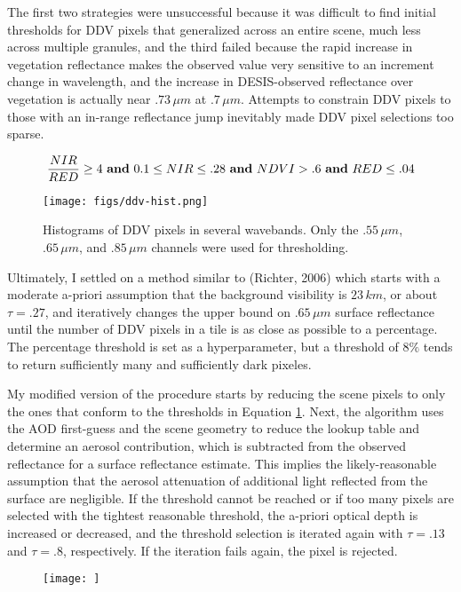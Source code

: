 \documentclass[12pt]{article}
\begin{document}
The first two strategies were unsuccessful because it was difficult to find initial thresholds for DDV pixels that generalized across an entire scene, much less across multiple granules, and the third failed because the rapid increase in vegetation reflectance makes the observed value very sensitive to an increment change in wavelength, and the increase in DESIS-observed reflectance over vegetation is actually near $.73\,\si{\mu m}$ at $.7\,\si{\mu m}$. Attempts to constrain DDV pixels to those with an in-range reflectance jump inevitably made DDV pixel selections too sparse.

\begin{equation}\label{ddv_thresh}
    \frac{NIR}{RED} \geq 4 \text{ \textbf{and} } 0.1 \leq NIR \leq .28 \text{ \textbf{and} } NDVI > .6 \text{ \textbf{and} } RED \leq .04
\end{equation}

\begin{figure}[h!]
    \centering
    \begin{center}
        \texttt{[image: figs/ddv-hist.png]}
    \end{center}
    \caption{Histograms of DDV pixels in several wavebands. Only the $.55\,\si{\mu m}$, $.65\,\si{\mu m}$, and $.85\,\si{\mu m}$ channels were used for thresholding.}
    \label{ddv-hist}
\end{figure}

Ultimately, I settled on a method similar to (Richter, 2006) which starts with a moderate a-priori assumption that the background visibility is $23\,\si{km}$, or about $\tau = .27$, and iteratively changes the upper bound on $.65\,\si{\mu m}$ surface reflectance until the number of DDV pixels in a tile is as close as possible to a percentage. The percentage threshold is set as a hyperparameter, but a threshold of $8\%$ tends to return sufficiently many and sufficiently dark pixeles.

My modified version of the procedure starts by reducing the scene pixels to only the ones that conform to the thresholds in Equation \ref{ddv-hist}. Next, the algorithm uses the AOD first-guess and the scene geometry to reduce the lookup table and determine an aerosol contribution, which is subtracted from the observed reflectance for a surface reflectance estimate. This implies the likely-reasonable assumption that the aerosol attenuation of additional light reflected from the surface are negligible. If the threshold cannot be reached or if too many pixels are selected with the tightest reasonable threshold, the a-priori optical depth is increased or decreased, and the threshold selection is iterated again with $\tau = .13$ and $\tau = .8$, respectively. If the iteration fails again, the pixel is rejected.

\begin{figure}[h!]
    \centering
    \begin{center}
        \texttt{[image: ]}
    \end{center}
    \caption{}
    \label{}
\end{figure}

\vspace{-1em}
\end{document}
